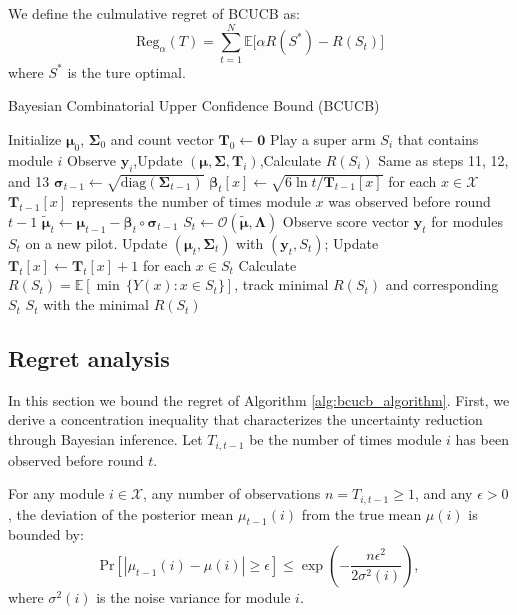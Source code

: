 \documentclass[opre,sglanonrev]{informs4}
\begin{document}
We define the culmulative regret of BCUCB as:
$$
    \text{Reg}_{\alpha}(T) = \sum_{t=1}^{N}\mathbb{E}\big[\alpha R(S^*) - R(S_t)\big]
$$
where $S^*$ is the ture optimal.

\begin{algorithm}
\caption{Bayesian Combinatorial Upper Confidence Bound (BCUCB)}
\label{alg:bcucb_algorithm}
\begin{algorithmic}[1]
\State Initialize $\boldsymbol{\mu}_0$, $\boldsymbol{\Sigma}_0$ and count vector $\mathbf{T}_0 \gets \mathbf{0}$ 
 
	\State Play a super arm $S_i$ that contains module $i$
	\State Observe $\mathbf{y}_i$,Update $(\boldsymbol{\mu}, \boldsymbol{\Sigma},\mathbf{T}_i)$,Calculate $R(S_i)$ \Comment Same as steps 11, 12, and 13
\EndFor
{} 
    \State $\boldsymbol{\sigma}_{t-1} \gets \sqrt{\text{diag}(\boldsymbol{\Sigma}_{t-1})}$ 
    \State $\boldsymbol{\beta}_t[x] \gets \sqrt{6 \ln t / \mathbf{T}_{t-1}[x]}$ for each $x \in \mathcal{X}$ \Comment $\mathbf{T}_{t-1}[x]$ represents the number of times module $x$ was observed before round $t-1$
    \State $\boldsymbol{\tilde{\mu}}_t \gets \boldsymbol{\mu}_{t-1} - \boldsymbol{\beta}_t \circ \boldsymbol{\sigma}_{t-1}$ 
    \State $S_t \gets \mathcal{O}(\boldsymbol{\tilde{\mu}}, \boldsymbol{\Lambda})$ 
    \State Observe score vector $\mathbf{y}_t$ for modules $S_t$ on a new pilot.
    \State Update $(\boldsymbol{\mu}_t, \boldsymbol{\Sigma}_t)$ with $(\mathbf{y}_t, S_t)$; Update $\mathbf{T}_t[x] \gets \mathbf{T}_t[x] + 1$ for each $x \in S_t$
    \State Calculate $R(S_t) = \mathbb{E}[\min\,\{Y(x) : x \in S_t\}]$, track minimal $R(S_t)$ and corresponding $S_t$ 
\EndFor
\State \Return $S_t$ with the minimal $R(S_t)$
\end{algorithmic}
\end{algorithm}

\subsection{Regret analysis}

In this section we bound the regret of Algorithm \ref{alg:bcucb_algorithm}.
First, we derive a concentration inequality that characterizes the uncertainty reduction through Bayesian inference. Let $T_{i,t-1}$ be the number of times module $i$ has been observed before round $t$.
\begin{lemma}
\label{lemma:concentration}
For any module $i \in \mathcal{X}$, any number of observations $n = T_{i,t-1} \geq 1$, and any $\epsilon > 0$, the deviation of the posterior mean $\mu_{t-1}(i)$ from the true mean $\mu(i)$ is bounded by:
$$
\mathrm{Pr}\left[|\mu_{t-1}(i) - \mu(i)| \geq \epsilon \right] \leq \exp\left(-\frac{n \epsilon^2}{2\sigma^2(i)}\right),
$$
where $\sigma^2(i)$ is the noise variance for module $i$.
\end{lemma}
\end{document}
